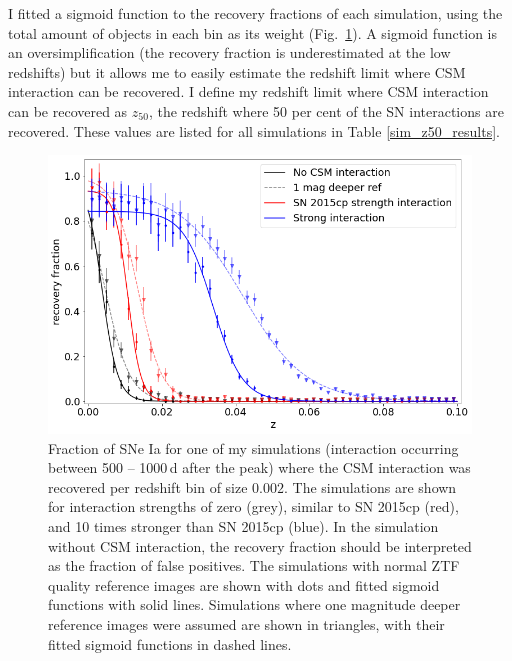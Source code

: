 \documentclass[a4paper,oneside,12pt, class=Latex/Classes/PhDthesisPSnPDF, crop=false]{standalone}
\begin{document}
I fitted a sigmoid function to the recovery fractions of each simulation, using the total amount of objects in each bin as its weight (Fig.~\ref{recov_fracs}). A sigmoid function is an oversimplification (the recovery fraction is underestimated at the low redshifts) but it allows me to easily estimate the redshift limit where CSM interaction can be recovered. I define my redshift limit where CSM interaction can be recovered as $z_{50}$, the redshift where 50 per cent of the SN interactions are recovered. These values are listed for all simulations in Table \ref{sim_z50_results}.

\begin{figure}
 \centering
 \includegraphics[width=\textwidth]{../Images/chapter_3/recov_fracs.png}
 \caption{Fraction of SNe Ia for one of my simulations (interaction occurring between 500 -- 1000\,d after the peak) where the CSM interaction was recovered per redshift bin of size $0.002$. The simulations are shown for interaction strengths of zero (grey), similar to SN 2015cp (red), and 10 times stronger than SN 2015cp (blue). In the simulation without CSM interaction, the recovery fraction should be interpreted as the fraction of false positives. The simulations with normal ZTF quality reference images are shown with dots and fitted sigmoid functions with solid lines. Simulations where one magnitude deeper reference images were assumed are shown in triangles, with their fitted sigmoid functions in dashed lines.}
 \label{recov_fracs}
\end{figure}
\end{document}
